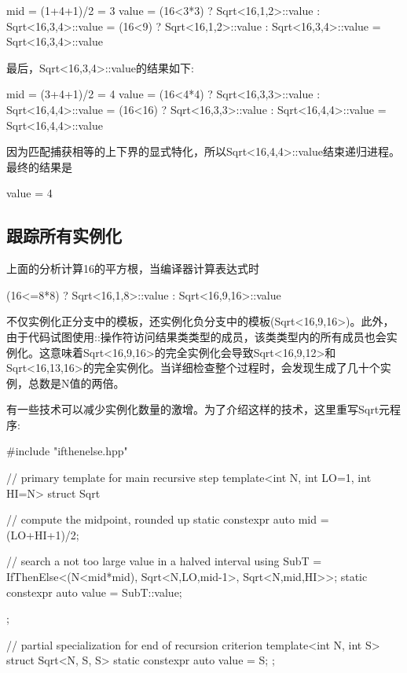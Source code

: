 \begin{cpp}
mid = (1+4+1)/2
	= 3
value = (16<3*3) ? Sqrt<16,1,2>::value
				: Sqrt<16,3,4>::value
	  = (16<9) ? Sqrt<16,1,2>::value
				: Sqrt<16,3,4>::value
	  = Sqrt<16,3,4>::value
\end{cpp}

最后，Sqrt<16,3,4>::value的结果如下:

\begin{cpp}
mid = (3+4+1)/2
	= 4
value = (16<4*4) ? Sqrt<16,3,3>::value
				: Sqrt<16,4,4>::value
	  = (16<16) ? Sqrt<16,3,3>::value
				: Sqrt<16,4,4>::value
	  = Sqrt<16,4,4>::value
\end{cpp}

因为匹配捕获相等的上下界的显式特化，所以Sqrt<16,4,4>::value结束递归进程。最终的结果是

\begin{cpp}
value = 4
\end{cpp}

\subsection{跟踪所有实例化}

上面的分析计算16的平方根，当编译器计算表达式时

\begin{cpp}
(16<=8*8) ? Sqrt<16,1,8>::value
		  : Sqrt<16,9,16>::value
\end{cpp}

不仅实例化正分支中的模板，还实例化负分支中的模板(Sqrt<16,9,16>)。此外，由于代码试图使用::操作符访问结果类类型的成员，该类类型内的所有成员也会实例化。这意味着Sqrt<16,9,16>的完全实例化会导致Sqrt<16,9,12>和Sqrt<16,13,16>的完全实例化。当详细检查整个过程时，会发现生成了几十个实例，总数是N值的两倍。

有一些技术可以减少实例化数量的激增。为了介绍这样的技术，这里重写Sqrt元程序:

\begin{cpp}
#include "ifthenelse.hpp"

// primary template for main recursive step
template<int N, int LO=1, int HI=N>
struct Sqrt {
	// compute the midpoint, rounded up
	static constexpr auto mid = (LO+HI+1)/2;
	
	// search a not too large value in a halved interval
	using SubT = IfThenElse<(N<mid*mid),
	Sqrt<N,LO,mid-1>,
	Sqrt<N,mid,HI>>;
	static constexpr auto value = SubT::value;
};

// partial specialization for end of recursion criterion
template<int N, int S>
struct Sqrt<N, S, S> {
	static constexpr auto value = S;
};
\end{cpp}

